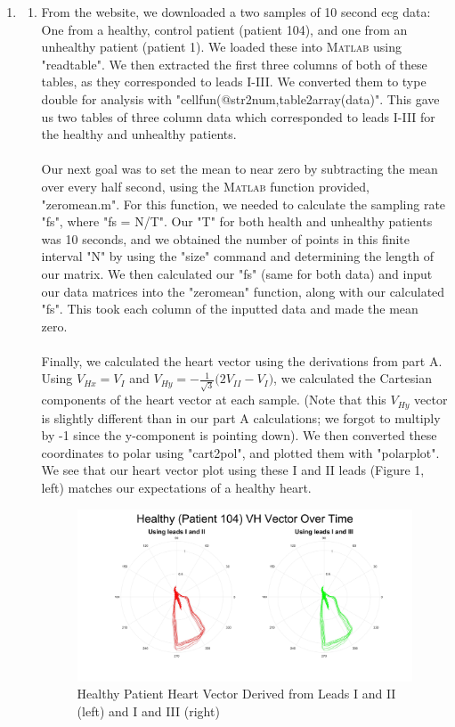 \documentclass[12pt, a4paper]{article}
\begin{document}
\begin{enumerate}
\item
\begin{enumerate}
\item From the website, we downloaded a two samples of 10 second ecg data: One from a healthy, control patient (patient 104), and one from an unhealthy patient (patient 1). We loaded these into \textsc{Matlab} using "readtable". We then extracted the first three columns of both of these tables, as they corresponded to leads I-III. We converted them to type double for analysis with "cellfun(@str2num,table2array(data)". This gave us two tables of three column data which corresponded to leads I-III for the healthy and unhealthy patients. \\ \\
Our next goal was to set the mean to near zero by subtracting the mean over every half second, using the \textsc{Matlab} function provided, "zeromean.m". For this function, we needed to calculate the sampling rate "fs", where "fs = N/T". Our "T" for both health and unhealthy patients was 10 seconds, and we obtained the number of points in this finite interval "N" by using the "size" command and determining the length of our matrix. We then calculated our "fs" (same for both data) and input our data matrices into the "zeromean" function, along with our calculated "fs". This took each column of the inputted data and made the mean zero. \\ \\
Finally, we calculated the heart vector using the derivations from part A. Using $V_{Hx} = V_I$ and $V_{Hy} = -\frac{1}{\sqrt{3}}({2V_{II} - V_I)}$, we calculated the Cartesian components of the heart vector at each sample. (Note that this $V_{Hy}$ vector is slightly different than in our part A calculations; we forgot to multiply by -1 since the y-component is pointing down). We then converted these coordinates to polar using "cart2pol", and plotted them with "polarplot". We see that our heart vector plot using these I and II leads (Figure 1, left) matches our expectations of a healthy heart.


\begin{figure}[h]
\centering
\includegraphics[width=1\textwidth]{ecg1}
\caption{Healthy Patient Heart Vector Derived from Leads I and II (left) and I and III (right)}
\end{figure}



\end{enumerate}
\end{enumerate}
\end{document}
